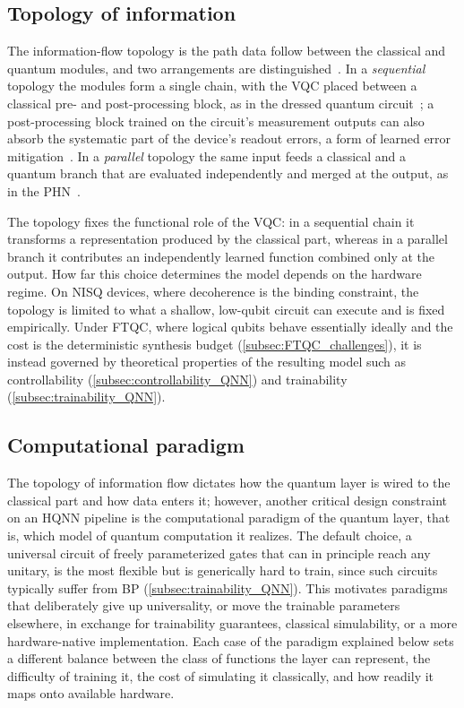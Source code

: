 \documentclass[aps,10pt,groupedaddress,prx,superscriptaddress,twocolumn,balancelastpage, tightenlines]{revtex4-2}
\theoremstyle{plain}  %
\begin{document}
\subsection{Topology of information}\label{subsec:topology_info}

The information-flow topology is the path data follow between the classical and quantum modules, and two arrangements are distinguished~\cite{Mitarai_2018_QClearning, mari2020transfer, Chen2020HybridNN, kordzanganeh2023parallel}. In a \emph{sequential} topology the modules form a single chain, with the \gls{VQC} placed between a classical pre- and post-processing block, as in the dressed quantum circuit~\cite{mari2020transfer}; a post-processing block trained on the circuit's measurement outputs can also absorb the systematic part of the device's readout errors, a form of learned error mitigation~\cite{Chen2020HybridNN}. In a \emph{parallel} topology the same input feeds a classical and a quantum branch that are evaluated independently and merged at the output, as in the \gls{PHN}~\cite{kordzanganeh2023parallel}.

The topology fixes the functional role of the \gls{VQC}: in a sequential chain it transforms a representation produced by the classical part, whereas in a parallel branch it contributes an independently learned function combined only at the output. How far this choice determines the model depends on the hardware regime. On \gls{NISQ} devices, where decoherence is the binding constraint, the topology is limited to what a shallow, low-qubit circuit can execute and is fixed empirically. Under \gls{FTQC}, where logical qubits behave essentially ideally and the cost is the deterministic synthesis budget (\autoref{subsec:FTQC_challenges}), it is instead governed by theoretical properties of the resulting model such as controllability (\autoref{subsec:controllability_QNN}) and trainability (\autoref{subsec:trainability_QNN}).



\subsection{Computational paradigm}

The topology of information flow dictates how the quantum layer is wired to the classical part and how data enters it; however, another critical design constraint on an \gls*{HQNN} pipeline is the computational paradigm of the quantum layer, that is, which model of quantum computation it realizes.
The default choice, a universal circuit of freely parameterized gates that can in principle reach any unitary, is the most flexible but is generically hard to train, since such circuits typically suffer from \gls{BP} (\autoref{subsec:trainability_QNN}). This motivates paradigms that deliberately give up universality, or move the trainable parameters elsewhere, in exchange for trainability guarantees, classical simulability, or a more hardware-native implementation. Each case of the paradigm explained below sets a different balance between the class of functions the layer can represent, the difficulty of training it, the cost of simulating it classically, and how readily it maps onto available hardware.
\end{document}
